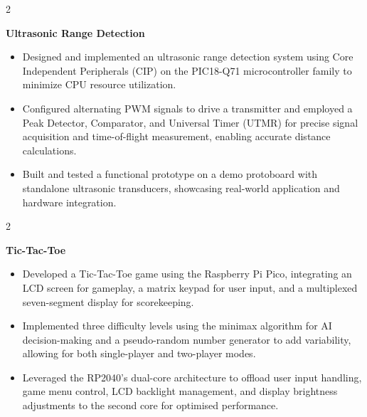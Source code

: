 \documentclass[10pt, a4paper]{article}
\newenvironment{highlights}{
    \begin{itemize}[
        topsep=0.1 cm,
        parsep=0.1 cm,
        partopsep=0pt,
        itemsep=0pt,
        leftmargin=0 cm + 10pt
    ]
}{
    \end{itemize}
} %
\newenvironment{twocolentry}[2][]{
    \onecolentry
    \def\secondColumn{#2}
    \setcolumnwidth{\fill, 3.5 cm}
    \begin{paracol}{2}
}{
    \switchcolumn \raggedleft \secondColumn
    \end{paracol}
    \endonecolentry
} %
\let\hrefWithoutArrow\href
\renewcommand{\href}[2]{\hrefWithoutArrow{#1}{\ifthenelse{\equal{#2}{}}{ }{#2 }\raisebox{.15ex}{\footnotesize \faExternalLink*}}}
\begin{document}
        \vspace{0.2 cm}

        \begin{twocolentry}{
            \href{https://github.com/microchip-pic-avr-examples/pic18f56q71-ultrasonic-range-detection-mplab-mcc}{GitHub}
        }
            \textbf{Ultrasonic Range Detection}
            \begin{highlights}
                \item Designed and implemented an ultrasonic range detection system using Core Independent Peripherals (CIP) on the PIC18-Q71 microcontroller family to minimize CPU resource utilization.
                \item Configured alternating PWM signals to drive a transmitter and employed a Peak Detector, Comparator, and Universal Timer (UTMR) for precise signal acquisition and time-of-flight measurement, enabling accurate distance calculations.
                \item Built and tested a functional prototype on a demo protoboard with standalone ultrasonic transducers, showcasing real-world application and hardware integration.
            \end{highlights}
        \end{twocolentry}


        \vspace{0.2 cm}

        \begin{twocolentry}{
            \href{https://github.com/cristiancristea00/tic-tac-toe}{GitHub}
        }
            \textbf{Tic-Tac-Toe}
            \begin{highlights}
                \item Developed a Tic-Tac-Toe game using the Raspberry Pi Pico, integrating an LCD screen for gameplay, a matrix keypad for user input, and a multiplexed seven-segment display for scorekeeping.
                \item Implemented three difficulty levels using the minimax algorithm for AI decision-making and a pseudo-random number generator to add variability, allowing for both single-player and two-player modes.
                \item Leveraged the RP2040’s dual-core architecture to offload user input handling, game menu control, LCD backlight management, and display brightness adjustments to the second core for optimised performance.
            \end{highlights}
        \end{twocolentry}
\end{document}
